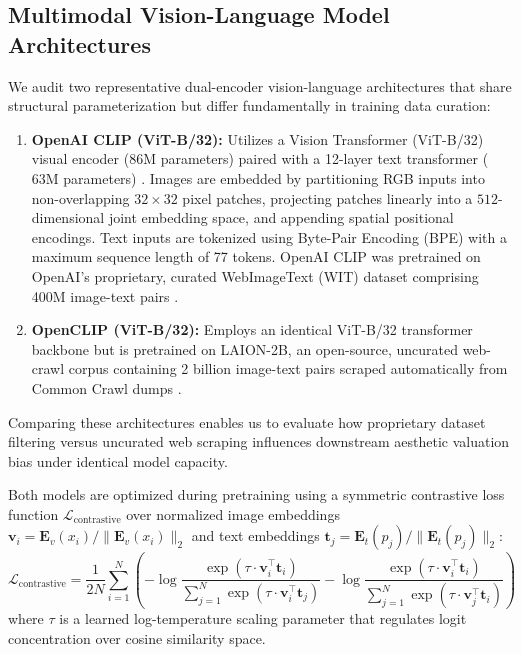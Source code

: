 \documentclass[pdflatex,sn-mathphys-num]{sn-jnl}%
\theoremstyle{thmstyleone}%
\theoremstyle{thmstyletwo}%
\theoremstyle{thmstylethree}%
\begin{document}
\subsection{Multimodal Vision-Language Model Architectures}
We audit two representative dual-encoder vision-language architectures that share structural parameterization but differ fundamentally in training data curation:
\begin{enumerate}
    \item \textbf{OpenAI CLIP (ViT-B/32):} Utilizes a Vision Transformer (ViT-B/32) visual encoder ($86\text{M}$ parameters) paired with a 12-layer text transformer ($63\text{M}$ parameters) \cite{dosovitskiy2020image, radford2021learning}. Images are embedded by partitioning RGB inputs into non-overlapping $32 \times 32$ pixel patches, projecting patches linearly into a $512$-dimensional joint embedding space, and appending spatial positional encodings. Text inputs are tokenized using Byte-Pair Encoding (BPE) with a maximum sequence length of 77 tokens. OpenAI CLIP was pretrained on OpenAI's proprietary, curated WebImageText (WIT) dataset comprising 400M image-text pairs \cite{radford2021learning}.
    \item \textbf{OpenCLIP (ViT-B/32):} Employs an identical ViT-B/32 transformer backbone but is pretrained on LAION-2B, an open-source, uncurated web-crawl corpus containing 2 billion image-text pairs scraped automatically from Common Crawl dumps \cite{cherti2023reproducible, schuhmann2022laion}.
\end{enumerate}
Comparing these architectures enables us to evaluate how proprietary dataset filtering versus uncurated web scraping influences downstream aesthetic valuation bias under identical model capacity.

Both models are optimized during pretraining using a symmetric contrastive loss function $\mathcal{L}_{\text{contrastive}}$ over normalized image embeddings $\mathbf{v}_i = \mathbf{E}_v(x_i) / \|\mathbf{E}_v(x_i)\|_2$ and text embeddings $\mathbf{t}_j = \mathbf{E}_t(p_j) / \|\mathbf{E}_t(p_j)\|_2$:
\begin{equation}
\mathcal{L}_{\text{contrastive}} = \frac{1}{2N} \sum_{i=1}^{N} \left( -\log \frac{\exp(\tau \cdot \mathbf{v}_i^\top \mathbf{t}_i)}{\sum_{j=1}^{N} \exp(\tau \cdot \mathbf{v}_i^\top \mathbf{t}_j)} - \log \frac{\exp(\tau \cdot \mathbf{v}_i^\top \mathbf{t}_i)}{\sum_{j=1}^{N} \exp(\tau \cdot \mathbf{v}_j^\top \mathbf{t}_i)} \right)
\end{equation}
where $\tau$ is a learned log-temperature scaling parameter that regulates logit concentration over cosine similarity space.
\end{document}
